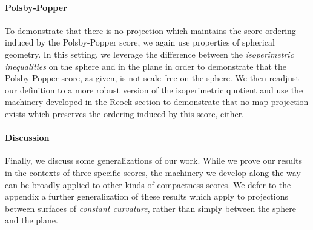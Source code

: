 \paragraph{Polsby-Popper}
To demonstrate that there is no projection which maintains the score ordering induced by the Polsby-Popper score, we again use properties of spherical geometry.  In this setting, we leverage the 
difference between the \textit{isoperimetric inequalities} on the sphere and in the plane in order to 
demonstrate that the Polsby-Popper score, as given, is not scale-free on the sphere.  We then readjust 
our definition to a more robust version of the isoperimetric quotient and use the machinery developed 
in the Reock section to demonstrate that no map projection exists which preserves the ordering induced by this score, either.

\paragraph{Discussion}
Finally, we discuss some generalizations of our work. While we prove our results in the contexts of three specific scores, the machinery we develop along the way can be broadly applied to other kinds of compactness scores.  We defer to the appendix a further generalization of these results which apply to projections between surfaces of \textit{constant curvature}, rather than simply between the sphere and the plane.


